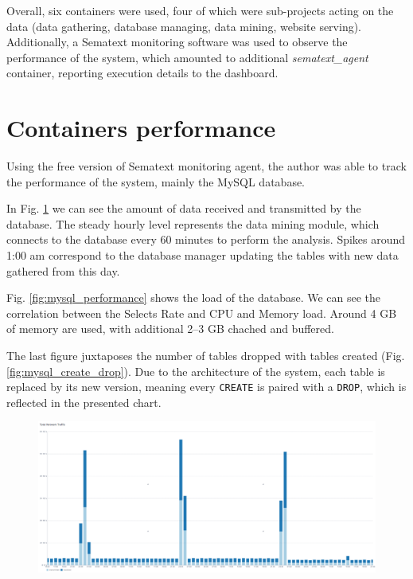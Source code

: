 Overall, six containers were used, four of which were sub-projects acting on the data (data gathering, database managing, data mining, website serving). Additionally, a Sematext monitoring software was used to observe the performance of the system, which amounted to additional \textit{sematext\_agent} container, reporting execution details to the dashboard.

\section{Containers performance}
Using the free version of Sematext monitoring agent, the author was able to track the performance of the system, mainly the MySQL database. \par
In Fig. \ref{fig:mysql_network} we can see the amount of data received and transmitted by the database. The steady hourly level represents the data mining module, which connects to the database every 60 minutes to perform the analysis. Spikes around 1:00 am correspond to the database manager updating the tables with new data gathered from this day. \par
Fig. \ref{fig:mysql_performance} shows the load of the database. We can see the correlation between the Selects Rate and CPU and Memory load. Around 4 GB of memory are used, with additional 2--3 GB chached and buffered. \par
The last figure juxtaposes the number of tables dropped with tables created (Fig. \ref{fig:mysql_create_drop}). Due to the architecture of the system, each table is replaced by its new version, meaning every \texttt{CREATE} is paired with a \texttt{DROP}, which is reflected in the presented chart.

\begin{figure}
    \centering
    \includegraphics[width=\textwidth]{figures/mysql_network.png}
    \caption{}
    \label{fig:mysql_network}
\end{figure}

